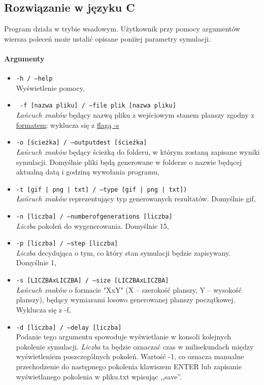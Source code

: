 \documentclass{mwart}
\begin{document}
\subsection{Rozwiązanie w języku C}
Program działa w trybie wsadowym.
Użytkownik przy pomocy argumentów wiersza poleceń może ustalić opisane poniżej parametry symulacji.

\paragraph{Argumenty} \label{argumenty}
\begin{itemize}
\item \texttt{-h / --help} \\ Wyświetlenie pomocy,
\item \texttt{ -f [nazwa pliku]  / --file plik [nazwa pliku] } 
	\\ \textit{ Łańcuch znaków }będący nazwą pliku z wejściowym stanem planszy zgodny z \hyperref[format]{\textcolor{LinkColor}{formatem}}; wyklucza się z  \hyperref[s]{\textcolor{LinkColor}{flagą -s}}
\item \texttt{-o [ścieżka] / --output\textunderscore{}dest [ścieżka]}  \\\textit{ Łańcuch znaków }będący ścieżką do folderu, w którym zostaną zapisane wyniki \label{output_dest} symulacji. Domyślnie pliki  będą generowane w folderze  o nazwie będącej aktualną datą i godziną wywołania programu,
\item \texttt{-t [gif | png | txt] / --type [gif | png | txt])} \\\textit{ Łańcuch znaków }reprezentujący typ generowanych rezultatów. Domyślnie gif, \label{output_args}
\item \texttt{-n [liczba] / --number\textunderscore{}of\textunderscore{}generations [liczba]} \\ \textit{ Liczba } pokoleń do wygenerowania. Domyślnie 15,
\item \texttt{-p [liczba] / --step [liczba]} \\ \textit{ Liczba }decydująca o tym, co który stan symulacji będzie zapisywany. Domyślnie 1,
\item \label{s} \texttt{-s [LICZBAxLICZBA] / --size [LICZBAxLICZBA]} \\ \textit{ Łańcuch znaków } o formacie "XxY" (X -- szerokość planszy, Y -- wysokość planszy), będący wymiarami losowo generowanej planszy początkowej. Wyklucza się z -f, 
\item \label{delay} \texttt{-d [liczba] / --delay [liczba]} \\ Podanie tego argumentu spowoduje wyświetlanie w konsoli kolejnych pokolenie symulacji. \textit{ Liczba } ta będzie oznaczać czas  w milisekundach między wyświetleniem poszczególnych pokoleń. Wartość -1, co oznacza manualne przechodzenie do następnego pokolenia klawiszem ENTER lub zapisanie wyświetlanego pokolenia w pliku.txt wpisując ,,save''.
\end{itemize}
\end{document}
